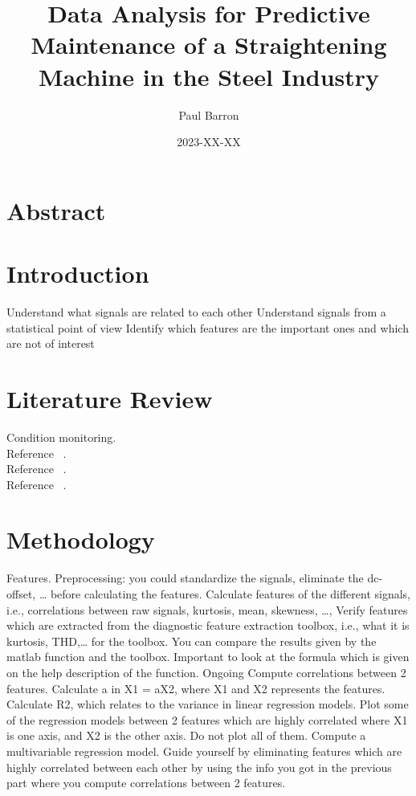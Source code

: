 \documentclass{article}
\title{Data Analysis for Predictive Maintenance of a Straightening Machine in the Steel Industry}
\date{2023-XX-XX}
\author{Paul Barron}
\begin{document}
\maketitle
\newpage
{}
\tableofcontents
\newpage
\section{Abstract}
 
\newpage
\section{Introduction}

Understand what signals are related to each other
Understand signals from a statistical point of view
Identify which features are the important ones and which are not of interest

\newpage  
\section{Literature Review}
Condition monitoring.\\
Reference ~\cite{caesarendra2017review}.\\
Reference ~\cite{james2013introduction}.\\
Reference ~\cite{soualhi2021novel}.

\newpage  
\section{Methodology}
Features.
Preprocessing: you could standardize the signals, eliminate the dc-offset, … before calculating the features.
Calculate features of the different signals, i.e., correlations between raw signals, kurtosis, mean, skewness, …,
Verify features which are extracted from the diagnostic feature extraction toolbox, i.e., what it is kurtosis, THD,… for the toolbox. You can compare the results given by the matlab function and the toolbox. Important to look at the formula which is given on the help description of the function. Ongoing
Compute correlations between 2 features.
Calculate a in X1 = aX2, where X1 and X2 represents the features.
Calculate R2, which relates to the variance in linear regression models.
Plot some of the regression models between 2 features which are highly correlated where X1 is one axis, and X2 is the other axis. Do not plot all of them.
Compute a multivariable regression model.
Guide yourself by eliminating features which are highly correlated between each other by using the info you got in the previous part where you compute correlations between 2 features.
\end{document}
